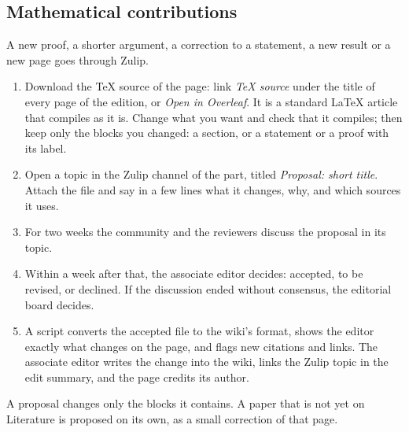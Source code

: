 \documentclass[11pt]{article}
\theoremstyle{definition}
\theoremstyle{remark}
\newcommand{\wikilink}[2]{\ifx\relax#2\relax#1\else#2\fi}
\begin{document}
\subsection{Mathematical contributions}
A new proof, a shorter argument, a correction to a statement, a new result or a new page goes through Zulip.
\begin{enumerate}
  \item Download the TeX source of the page: link \emph{TeX source} under the title of every page of the edition, or \emph{Open in Overleaf}. It is a standard LaTeX article that compiles as it is. Change what you want and check that it compiles; then keep only the blocks you changed: a section, or a statement or a proof with its label.
  \item Open a topic in the Zulip channel of the part, titled \emph{Proposal: short title}. Attach the file and say in a few lines what it changes, why, and which sources it uses.
  \item For two weeks the community and the reviewers discuss the proposal in its topic.
  \item Within a week after that, the associate editor decides: accepted, to be revised, or declined. If the discussion ended without consensus, the editorial board decides.
  \item A script converts the accepted file to the wiki's format, shows the editor exactly what changes on the page, and flags new citations and links. The associate editor writes the change into the wiki, links the Zulip topic in the edit summary, and the page credits its author.
\end{enumerate}
A proposal changes only the blocks it contains. A paper that is not yet on \wikilink{Literature}{} is proposed on its own, as a small correction of that page.
\end{document}
